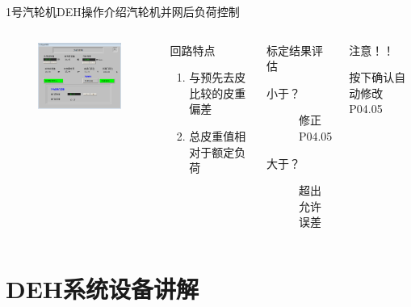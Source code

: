 \documentclass[12pt,hyperref={CJKbookmarks=true}]{beamer} %
\begin{document}
\begin{frame}{1号汽轮机DEH操作介绍}{汽轮机并网后负荷控制}
  		\begin{columns}
\begin{figure}
\includegraphics[angle=0,width=150pt,trim=0 0 0 0,clip]{pic/fuhe.png}
	
\end{figure}
\begin{block}{回路特点}
			\begin{enumerate}
				\item  与预先去皮比较的皮重偏差
				\item  总皮重值相对于额定负荷
				\end{enumerate}
\end{block}
\begin{exampleblock}{标定结果评估}
			\begin{description}
				\item[小于？]修正P04.05
				\item[大于？]超出允许误差
				\end{description}
\end{exampleblock}
\begin{alertblock}{注意！！}
			
				按下确认自动修改P04.05
\end{alertblock}
		\end{columns}
\end{frame}
\section{DEH系统设备讲解}
\end{document}
